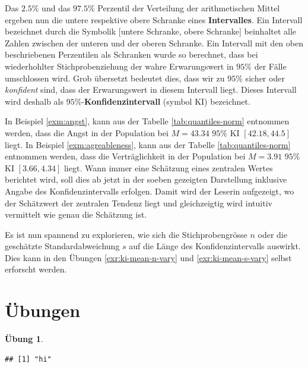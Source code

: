 \documentclass[
]{book}
\theoremstyle{definition}
\theoremstyle{definition}
\theoremstyle{definition}
\newtheorem{exercise}{Übung}[chapter]
\theoremstyle{definition}
\theoremstyle{remark}
\begin{document}
Das \(2.5\%\) und das \(97.5\%\) Perzentil der Verteilung der arithmetischen Mittel ergeben nun die untere respektive obere Schranke eines \label{customdef-interval}{\textbf{Intervalles}. Ein Intervall bezeichnet durch die Symbolik \([\)untere Schranke, obere Schranke\(]\) beinhaltet alle Zahlen zwischen der unteren und der oberen Schranke.} \label{customdef-confidence-interval}{Ein Intervall mit den oben beschriebenen Perzentilen als Schranken wurde so berechnet, dass bei wiederhohlter Stichprobenziehung der wahre Erwarungswert in \(95\%\) der Fälle umschlossen wird. Grob übersetzt bedeutet dies, dass wir zu \(95\%\) sicher oder \emph{konfident} sind, dass der Erwarungswert in diesem Intervall liegt. Dieses Intervall wird deshalb als \(95\%\)-\textbf{Konfidenzintervall} (symbol KI) bezeichnet.}

In Beispiel \ref{exm:angst}, kann aus der Tabelle \ref{tab:quantiles-norm} entnommen werden, dass die Angst in der Population bei \(M = 43.34\) \(95\%\) KI \([42.18,44.5]\) liegt. In Beispiel \ref{exm:agreableness}, kann aus der Tabelle \ref{tab:quantiles-norm} entnommen werden, dass die Verträglichkeit in der Population bei \(M = 3.91\) \(95\%\) KI \([3.66,4.34]\) liegt. Wann immer eine Schätzung eines zentralen Wertes berichtet wird, soll dies ab jetzt in der soeben gezeigten Darstellung inklusive Angabe des Konfidenzintervalls erfolgen. Damit wird der Leserin aufgezeigt, wo der Schätzwert der zentralen Tendenz liegt und gleichzeigtig wird intuitiv vermittelt wie genau die Schätzung ist.

Es ist nun spannend zu explorieren, wie sich die Stichprobengrösse \(n\) oder die geschätzte Standardabweichung \(s\) auf die Länge des Konfidenzintervalls auswirkt. Dies kann in den Übungen \ref{exr:ki-mean-n-vary} und \ref{exr:ki-mean-s-vary} selbst erforscht werden.

\section{Übungen}\label{uxfcbungen-1}

\begin{exercise}
\protect\hypertarget{exr:interpret-report1}{}\label{exr:interpret-report1}\leavevmode

\begin{verbatim}
## [1] "hi"
\end{verbatim}

\end{exercise}
\end{document}
